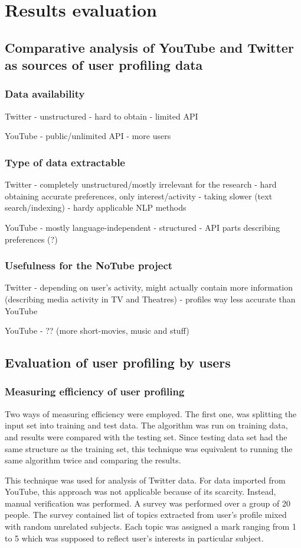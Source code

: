 \section{Results evaluation}

\subsection{Comparative analysis of YouTube and Twitter as sources of user
profiling data}

\subsubsection{Data availability}
Twitter
- unstructured
- hard to obtain
- limited API

YouTube
- public/unlimited API
- more users

\subsubsection{Type of data extractable}
Twitter
- completely unstructured/mostly irrelevant for the research
- hard obtaining accurate preferences, only interest/activity
- taking slower (text search/indexing)
- hardy applicable NLP methods

YouTube
- mostly language-independent
- structured
- API parts describing preferences (?)

\subsubsection{Usefulness for the NoTube project}
Twitter
- depending on user's activity, might actually contain more information (describing media activity in TV and Theatres)
- profiles way less accurate than YouTube

YouTube
- ?? (more short-movies, music and stuff)

\subsection{Evaluation of user profiling by users}
\subsubsection{Measuring efficiency of user profiling}

Two ways of measuring efficiency were employed. The first one, was splitting the
input set into training and test data. The algorithm was run on training data,
and results were compared with the testing set. Since testing data set had the
same structure as the training set, this technique was equivalent to running the
same algorithm twice and comparing the results.

This technique was used for analysis of Twitter data. For data imported from
YouTube, this approach was not applicable because of its scarcity. Instead,
manual verification was performed. A survey was performed over a group of 20
people. The survey contained list of topics extracted from user's profile mixed
with random unrelated subjects. Each topic was assigned a mark ranging from 1 to
5 which was supposed to reflect user's interests in particular subject.
